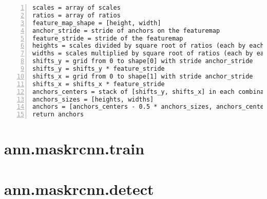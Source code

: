{\scriptsize
\begin{lstlisting}[style=python, caption={generate\_anchors}, captionpos=b, label=code:anchors, deletekeywords={range, from, map, in},
backgroundcolor = \color{light-gray}, numbers=left, breaklines=true]
scales = array of scales
ratios = array of ratios
feature_map_shape = [height, width]
anchor_stride = stride of anchors on the featuremap
feature_stride = stride of the featuremap
heights = scales divided by square root of ratios (each by each)
widths = scales multiplied by square root of ratios (each by each)
shifts_y = grid from 0 to shape[0] with stride anchor_stride
shifts_y = shifts_y * feature_stride
shifts_x = grid from 0 to shape[1] with stride anchor_stride
shifts_x = shifts_x * feature_stride
anchors_centers = stack of [shifts_y, shifts_x] in each combination
anchors_sizes = [heights, widths]
anchors = [anchors_centers - 0.5 * anchors_sizes, anchors_centers + 0.5 * anchors_sizes]
return anchors
\end{lstlisting}}

\section{ann.maskrcnn.train}
\label{train-module}

\section{ann.maskrcnn.detect}
\label{detect-module}
